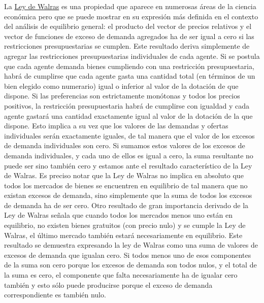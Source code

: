 \documentclass{nuevotema}
\begin{document}
La \underline{Ley de Walras} es una propiedad que aparece en numerosas áreas de la ciencia económica pero que se puede mostrar en su expresión más definida en el contexto del análisis de equilibrio general: el producto del vector de precios relativos y el vector de funciones de exceso de demanda agregados ha de ser igual a cero si las restricciones presupuestarias se cumplen. Este resultado deriva simplemente de agregar las restricciones presupuestarias individuales de cada agente. Si se postula que cada agente demanda bienes cumpliendo con una restricción presupuestaria, habrá de cumplirse que cada agente gasta una cantidad total (en términos de un bien elegido como numerario) igual o inferior al valor de la dotación de que dispone. Si las preferencias son estrictamente monótonas y todos los precios positivos, la restricción presupuestaria habrá de cumplirse con igualdad y cada agente gastará una cantidad exactamente igual al valor de la dotación de la que dispone. Esto implica a su vez que los valores de las demandas y ofertas individuales serán exactamente iguales, de tal manera que el valor de los excesos de demanda individuales son cero. Si sumamos estos valores de los excesos de demanda individuales, y cada uno de ellos es igual a cero, la suma resultante no puede ser sino también cero y estamos ante el resultado característico de la Ley de Walras. Es preciso notar que la Ley de Walras no implica en absoluto que todos los mercados de bienes se encuentren en equilibrio de tal manera que no existan excesos de demanda, sino simplemente que la suma de todos los excesos de demanda ha de ser cero. Otro resultado de gran importancia derivado de la Ley de Walras señala que cuando todos los mercados menos uno están en equilibrio, no existen bienes gratuitos (con precio nulo) y se cumple la Ley de Walras, el último mercado también estará necesariamente en equilibrio. Este resultado se demuestra expresando la ley de Walras como una suma de valores de excesos de demanda que igualan cero. Si todos menos uno de esos componentes de la suma son cero porque los excesos de demanda son todos nulos, y el total de la suma es cero, el componente que falta necesariamente ha de igualar cero también y esto sólo puede producirse porque el exceso de demanda correspondiente es también nulo.
\end{document}
